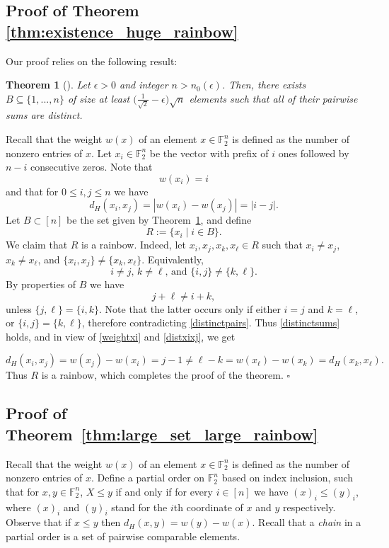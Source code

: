 \documentclass{article}
\newtheorem{thm}{Theorem}%
\theoremstyle{definition}
\begin{document}
\subsection{Proof of Theorem \ref{thm:existence_huge_rainbow}}
Our proof relies on the following result:
\begin{thm}[\cite{erdos1941problem}]\label{thm:erdos1941problem}
Let $\epsilon > 0$ and integer $n > n_0(\epsilon)$.  Then, there exists $B \subseteq  \{1,...,n\}$ of size at least $\big(\frac{1}{\sqrt{2}} - \epsilon\big)\sqrt{n}$ elements such that all of their pairwise sums are distinct. 
\end{thm}
 
Recall that the weight $w(x)$ of an element $x\in \mathbb{F}_2^n$ is defined as the number of nonzero entries of $x$.
Let 
$x_i\in \mathbb{F}_2^n$ be  the vector with prefix of $i$ ones followed by $n-i$ consecutive zeros.
Note that  \begin{equation}\label{weightxi}w(x_i)=i\end{equation} and that for $0\le i,j\le n$ we have
\begin{equation}\label{distxixj}
d_H(x_i, x_j) = |w(x_i) - w(x_j)|
= |i-j|.
\end{equation}
Let $B\subset [n]$ be the set given by Theorem~\ref{thm:erdos1941problem}, and define
$$
R:=\{x_i\mid i\in B\}.
$$
We claim that $R$ is a rainbow.
Indeed, let $x_i,x_j,x_k,x_\ell\in R$ such that $x_i\neq x_j$, $x_k\neq x_\ell$, and $\{x_i,x_j\}\neq \{x_k,x_\ell\}$. Equivalently,
\begin{equation}\label{distinctpairs}
    \text{$i\neq j$, $k\neq \ell$, and $\{i,j\}\neq \{k,\ell\}$.}
    \end{equation}
By properties of $B$ we have
\begin{equation}\label{distinctsums}
j+\ell\neq i+k,
\end{equation}
unless $\{j,\ell\}=\{i,k\}.$
Note that the latter occurs only if either $i=j$ and $k=\ell$, or $\{i,j\}=\{k,\ell\}$, therefore contradicting \eqref{distinctpairs}. Thus \eqref{distinctsums} holds, and in view of \eqref{weightxi} and \eqref{distxixj}, we get

$$
d_H(x_i,x_j)=w(x_j)-w(x_i)=j-1\neq \ell-k=w(x_\ell)-w(x_k)=d_H(x_k,x_\ell).$$
Thus $R$ is a rainbow, which completes the proof of the theorem. \hfill$\square$


\subsection{Proof of Theorem~\ref{thm:large_set_large_rainbow}}
Recall that the weight $w(x)$ of an element $x\in \mathbb{F}_2^n$ is defined as the number of nonzero entries of $x$.
Define a partial order on $\mathbb{F}_2^n$ based on index inclusion, such that for $x,y\in \mathbb{F}_2^n$, $X\leq y$ if and only if for every $i\in [n]$ we have $(x)_i\leq (y)_i$, where $(x)_i$ and $(y)_i$ stand for the $i$th coordinate of $x$ and $y$ respectively. Observe that if $x\le y$ then $d_H(x,y)=w(y)-w(x)$. 
Recall that a {\it chain} in a partial order is a set of pairwise comparable elements. 
\end{document}
